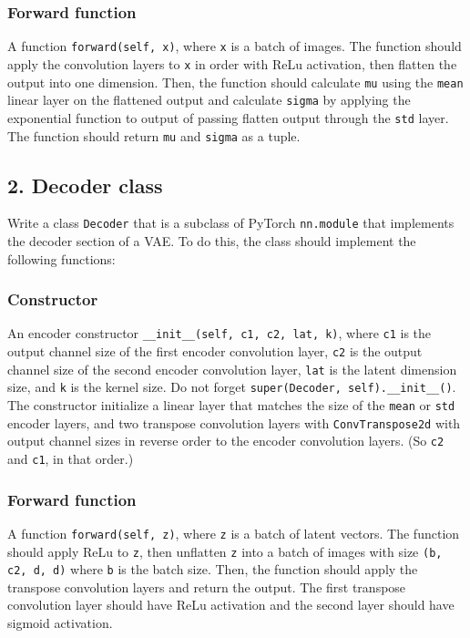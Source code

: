 \documentclass{article}
\begin{document}
\subsubsection*{Forward function}
A function \texttt{forward(self, x)}, where \texttt{x} is a batch of images. The function should apply the convolution layers to \texttt{x} in order with ReLu activation, then flatten the output into one dimension. Then, the function should calculate \texttt{mu} using the \texttt{mean} linear layer on the flattened output and calculate \texttt{sigma} by applying the exponential function to output of passing flatten output through the \texttt{std} layer. The function should return \texttt{mu} and \texttt{sigma} as a tuple. 

\subsection*{2. Decoder class}
Write a class \texttt{Decoder} that is a subclass of PyTorch \texttt{nn.module} that implements the decoder section of a VAE. To do this, the class should implement the following functions:
\subsubsection*{Constructor}
An encoder constructor \texttt{\_\_init\_\_(self, c1, c2, lat, k)}, where \texttt{c1} is the output channel size of the first encoder convolution layer, \texttt{c2} is the output channel size of the second encoder convolution layer, \texttt{lat} is the latent dimension size, and \texttt{k} is the kernel size. Do not forget \texttt{super(Decoder, self).\_\_init\_\_()}. The constructor initialize a linear layer that matches the size of the \texttt{mean} or \texttt{std} encoder layers, and two transpose convolution layers with \texttt{ConvTranspose2d} with output channel sizes in reverse order to the encoder convolution layers. (So \texttt{c2} and \texttt{c1}, in that order.)

\subsubsection*{Forward function}
A function \texttt{forward(self, z)}, where \texttt{z} is a batch of latent vectors. The function should apply ReLu to \texttt{z}, then unflatten \texttt{z} into a batch of images with size \texttt{(b, c2, d, d)} where \texttt{b} is the batch size. Then, the function should apply the transpose convolution layers and return the output. The first transpose convolution layer should have ReLu activation and the second layer should have sigmoid activation.
\end{document}
